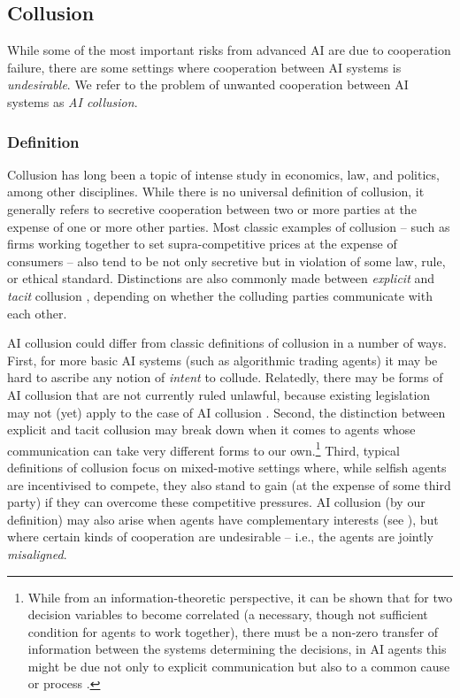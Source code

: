 \subsection{Collusion}
\label{sec:collusion}

While some of the most important risks from advanced AI are due to cooperation failure, there are some settings where cooperation between AI systems is \emph{undesirable}. We refer to the problem of unwanted cooperation between AI systems as \emph{AI collusion}.

\subsubsection{Definition}

Collusion has long been a topic of intense study in economics, law, and politics, among other disciplines.
While there is no universal definition of collusion, it generally refers to secretive cooperation between two or more parties at the expense of one or more other parties.
Most classic examples of collusion -- such as firms working together to set supra-competitive prices at the expense of consumers -- also tend to be not only secretive but in violation of some law, rule, or ethical standard.
Distinctions are also commonly made between \emph{explicit} and \emph{tacit} collusion \citep{Rees1993}, depending on whether the colluding parties communicate with each other.

AI collusion could differ from classic definitions of collusion in a number of ways.
First, for more basic AI systems (such as algorithmic trading agents) it may be hard to ascribe any notion of \textit{intent} to collude.
Relatedly, there may be forms of AI collusion that are not currently ruled unlawful, because existing legislation may not (yet) apply to the case of AI collusion \citep{Harrington2019,beneke_artificial_2019}.
Second, the distinction between explicit and tacit collusion may break down when it comes to agents whose communication can take very different forms to our own.\footnote{While from an information-theoretic perspective, it can be shown that for two decision variables to become correlated (a necessary, though not sufficient condition for agents to work together), there must be a non-zero transfer of information between the systems determining the decisions, in AI agents this might be due not only to explicit communication but also to a common cause or process \citep{Hart2000,Cover2005,CesaBianchi2006,Pearl2009a}.}
Third, typical definitions of collusion focus on mixed-motive settings where, while selfish agents are incentivised to compete, they also stand to gain (at the expense of some third party) if they can overcome these competitive pressures.
AI collusion (by our definition) may also arise when agents have complementary interests (see ), but where certain kinds of cooperation are undesirable -- i.e., the agents are jointly \textit{misaligned}.

